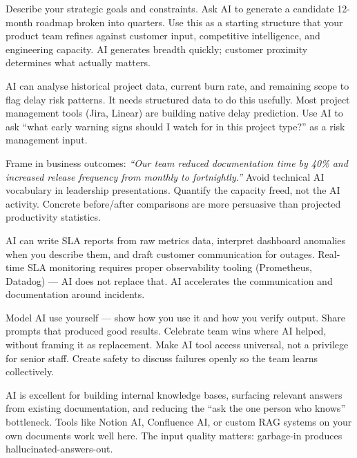 {Describe your strategic goals and constraints.
Ask AI to generate a candidate 12-month roadmap broken into quarters.
Use this as a starting structure that your product team refines against customer input,
competitive intelligence, and engineering capacity.
AI generates breadth quickly; customer proximity determines what actually matters.}

{AI can analyse historical project data, current burn rate, and remaining scope to flag
delay risk patterns.
It needs structured data to do this usefully.
Most project management tools (Jira, Linear) are building native delay prediction.
Use AI to ask ``what early warning signs should I watch for in this project type?''
as a risk management input.}

{Frame in business outcomes: \textit{``Our team reduced documentation time by 40\% and
increased release frequency from monthly to fortnightly.''}
Avoid technical AI vocabulary in leadership presentations.
Quantify the capacity freed, not the AI activity.
Concrete before/after comparisons are more persuasive than projected productivity
statistics.}

{AI can write SLA reports from raw metrics data, interpret dashboard anomalies when
you describe them, and draft customer communication for outages.
Real-time SLA monitoring requires proper observability tooling (Prometheus, Datadog) ---
AI does not replace that.
AI accelerates the communication and documentation around incidents.}

{Model AI use yourself --- show how you use it and how you verify output.
Share prompts that produced good results.
Celebrate team wins where AI helped, without framing it as replacement.
Make AI tool access universal, not a privilege for senior staff.
Create safety to discuss failures openly so the team learns collectively.}

{AI is excellent for building internal knowledge bases, surfacing relevant answers from
existing documentation, and reducing the ``ask the one person who knows'' bottleneck.
Tools like Notion AI, Confluence AI, or custom RAG systems on your own documents
work well here.
The input quality matters: garbage-in produces hallucinated-answers-out.}

